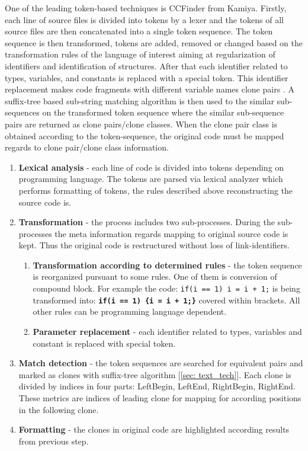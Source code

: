 \documentclass{report}
\begin{document}
One of the leading token-based techniques is CCFinder from Kamiya\cite{tocken_kamiya}. Firstly, each line of source files is divided into tokens by a lexer and the tokens of all source files are then concatenated into a single token sequence. The token sequence is then transformed, tokens are added, removed or changed based on the transformation rules of the language of interest aiming at regularization of identifiers and identification of structures. 
After that each identifier related to types, variables, and constants is replaced with a special token\cite{tocken_kamiya}. This identifier replacement makes code fragments with different variable names clone pairs \cite{tocken_kamiya}. A suffix-tree based sub-string matching algorithm is then used 
to the similar sub-sequences on the transformed token sequence where the similar sub-sequence pairs are returned as clone pairs/clone classes\cite{tocken_kamiya}. When the clone pair class is obtained according to the token-sequence, the original code must be mapped regards to clone pair/clone class information.
\begin{enumerate}
  \item \textbf{Lexical analysis} - each line of code is divided into tokens depending on programming language. The tokens are parsed via lexical analyzer which performs formatting of tokens, the rules described above reconstructing the source code is.
\item \textbf{Transformation}  - the process includes two sub-processes. During the sub-processes the meta information regards mapping to original source code is kept. Thus the original code is restructured without loss of link-identifiers.
  \begin{enumerate}[label*=\arabic*.]
    \item \textbf{Transformation according to determined rules} - the token sequence is reorganized pursuant to some rules. One of them is conversion of compound block. For example the code: \texttt{if(i == 1) i = i + 1;} is being transformed into: \texttt{\textbf{if(i == 1) \{i = i + 1;\}}} covered within brackets. All other rules can be programming language dependent.
    \item \textbf{Parameter replacement} - each identifier related to types, variables and constant is replaced with special token\cite{tocken_kamiya}.
  \end{enumerate} 
  \item\textbf{Match detection} - the token sequences are searched for equivalent pairs and marked as clones with suffix-tree algorithm [\ref{sec: text_tech}]. Each clone is divided by indices in four parts: LeftBegin, LeftEnd, RightBegin, RightEnd. These metrics are indices of leading clone for mapping for according positions in the following clone.
  \item\textbf{Formatting} - the clones in original code are highlighted according results from previous step.
\end{enumerate}
\end{document}
